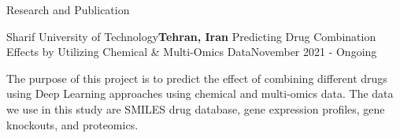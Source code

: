 \documentclass{resume} %
\begin{document}
\begin{rSection}{Research and Publication}
\begin{rSubsection}{Sharif University of Technology}{\textcolor{Black!70}{\bf Tehran, Iran}}
{Predicting Drug Combination Effects by Utilizing Chemical \& Multi-Omics Data}{\textcolor{Black!70}{November 2021 - Ongoing}}
\begin{small}
\item The purpose of this project is to predict the effect of combining different drugs using Deep Learning approaches using chemical and multi-omics data. The data we use in this study are SMILES drug database, gene expression profiles, gene knockouts, and proteomics.
\end{small}
\end{rSubsection}



\end{rSection}
\end{document}
